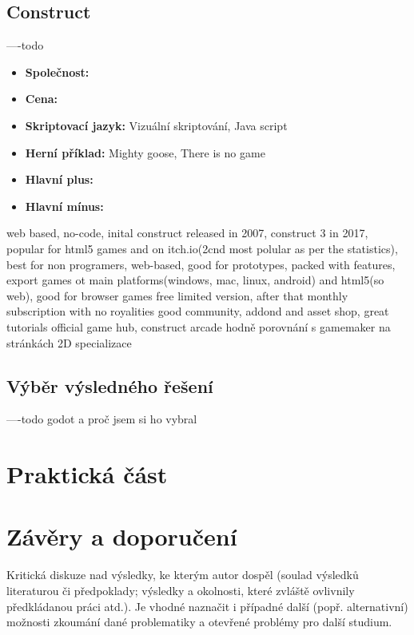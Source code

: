 \subsection{Construct}
----todo \linebreak
{}

\begin{itemize}
	\item \textbf{Společnost: }
	\item \textbf{Cena: }
	\item \textbf{Skriptovací jazyk: }  Vizuální skriptování, Java script
	\item \textbf{Herní příklad: } Mighty goose, There is no game
	\item \textbf{Hlavní plus: }
	\item \textbf{Hlavní mínus: }
\end{itemize}

web based, no-code, inital construct released in 2007, construct 3 in 2017, popular for html5 games and on itch.io(2cnd most polular as per the statistics\cite{itch_io_engines}),
best for non programers, web-based, good for prototypes, packed with features, export games ot main platforms(windows, mac, linux, android) and html5(so web), good for browser games
free limited version, after that monthly subscription with no royalities
good community, addond and asset shop, great tutorials
official game hub, construct arcade
hodně porovnání s gamemaker na stránkách
2D specializace


\subsection{Výběr výsledného řešení}
----todo \linebreak godot a proč jsem si ho vybral


\section{Praktická část}



\section{Závěry a doporučení}


Kritická diskuze nad výsledky, ke kterým autor dospěl (soulad výsledků  literaturou či předpoklady;
výsledky a okolnosti, které zvláště ovlivnily předkládanou práci atd.). Je vhodné naznačit i případné další
(popř. alternativní) možnosti zkoumání dané problematiky a otevřené problémy pro další studium.

